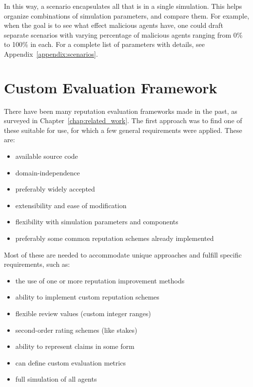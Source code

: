 \documentclass[%
    ]{\PathToTumTemplate/thesis/tum_thesis}
\begin{document}
In this way, a scenario encapsulates all that is in a single simulation.
This helps organize combinations of simulation parameters, and compare them.
For example, when the goal is to see what effect malicious agents have, one could draft separate scenarios with varying percentage of malicious agents ranging from 0\% to 100\% in each.
For a complete list of parameters with details, see Appendix~\ref{appendix:scenarios}.



\section{Custom Evaluation Framework}\label{sec:approach_evaluation_framework}


There have been many reputation evaluation frameworks made in the past, as surveyed in Chapter~\ref{chap:related_work}.
The first approach was to find one of these suitable for use, for which a few general requirements were applied.
These are:
\begin{itemize}
    \item available source code
    \item domain-independence
    \item preferably widely accepted
    \item extensibility and ease of modification
    \item flexibility with simulation parameters and components
    \item preferably some common reputation schemes already implemented
\end{itemize}

Most of these are needed to accommodate unique approaches and fulfill specific requirements, such as:
\begin{itemize}
    \item the use of one or more reputation improvement methods
	\item ability to implement custom reputation schemes
    \item flexible review values (custom integer ranges)
    \item second-order rating schemes (like stakes)
    \item ability to represent \glspl{claim} in some form
    \item can define custom evaluation metrics
    \item full simulation of all agents
\end{itemize}
\end{document}
